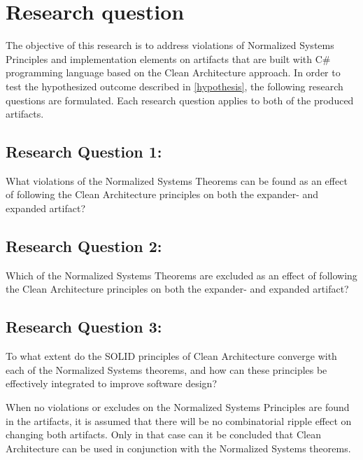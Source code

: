 \section{Research question} \label{sec:research_questions}

The objective of this research is to address violations of Normalized Systems Principles
and implementation elements on artifacts that are built with C\# programming language
based on the Clean Architecture approach. In order to test the hypothesized outcome
described in \ref{hypothesis}, the following research questions are formulated. Each
research question applies to both of the produced artifacts.

\subsection*{Research Question 1:} \label{rq1}
What violations of the Normalized Systems Theorems can be found as an effect of
following the Clean Architecture principles on both the expander- and expanded artifact?

\subsection*{Research Question 2:} \label{rq2}
Which of the Normalized Systems Theorems are excluded as an effect of following the
Clean Architecture principles on both the expander- and expanded artifact?

\subsection*{Research Question 3:} \label{rq3}
To what extent do the SOLID principles of Clean Architecture converge with each of the
Normalized Systems theorems, and how can these principles be effectively integrated to
improve software design?

When no violations or excludes on the Normalized Systems Principles are found in the
artifacts, it is assumed that there will be no combinatorial ripple effect on changing
both artifacts. Only in that case can it be concluded that Clean Architecture can be
used in conjunction with the Normalized Systems theorems. 